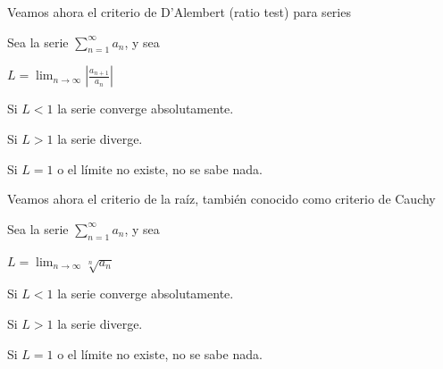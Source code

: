 Veamos ahora el criterio de D'Alembert (ratio test) para series

\begin{theorem}[D'Alembert]
Sea la serie $\sum_{n = 1}^\infty a_n$, y sea 

$L = \lim_{n \to \infty} \left| \frac{a_{n+1}}{a_n} \right|$

Si $L < 1$ la serie converge absolutamente.

Si $L > 1$ la serie diverge.

Si $L = 1$ o el límite no existe, no se sabe nada.
\end{theorem}

Veamos ahora el criterio de la raíz, también conocido como criterio de Cauchy

\begin{theorem}[Cauchy]
Sea la serie $\sum_{n = 1}^\infty a_n$, y sea 

$L = \lim_{n \to \infty} \sqrt[n]{a_n}$

Si $L < 1$ la serie converge absolutamente.

Si $L > 1$ la serie diverge.

Si $L = 1$ o el límite no existe, no se sabe nada.
\end{theorem}






